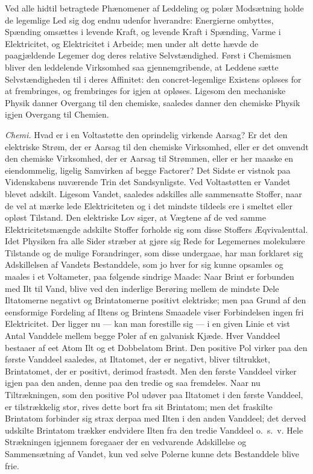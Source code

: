 \documentclass[12pt]{book}
\newcommand{\apage}[1]{\marginnote{\footnotesize\textit{[#1]}}}
\begin{document}
\noindent Ved alle hidtil betragtede Phænomener af Leddeling og polær
Modsætning holde de legemlige Led sig dog endnu udenfor hverandre:
Energierne ombyttes, Spænding omsættes i levende Kraft, og levende Kraft i
Spænding, Varme i Elektricitet, og Elektricitet i Arbeide; men under alt
dette hævde de paagjældende Legemer dog deres relative Selvstændighed.
Først i Chemismen bliver den leddelende Virksomhed saa gjennemgribende, at
Leddene sætte Selvstændigheden til i deres Affinitet: den concret-legemlige
Existens opløses for at frembringes, og frembringes for igjen at opløses.
Ligesom den mechaniske Physik danner Overgang til den chemiske, saaledes
danner den chemiske Physik igjen Overgang til Chemien.

\emph{Chemi.} Hvad er i en Voltastøtte den oprindelig virkende Aarsag? Er
det den elektriske Strøm, der er Aarsag til den chemiske Virksomhed, eller
er det omvendt den chemiske Virksomhed, der er Aarsag til Strømmen, eller
er her maaske en eiendommelig, ligelig Samvirken af begge Factorer? Det
Sidste er vistnok paa Videnskabens nuværende Trin det Sandsynligste. Ved
Voltastøtten er Vandet blevet adskilt. \apage{152} Ligesom Vandet, saaledes adskilles
alle sammensatte Stoffer, naar de vel at mærke lede Elektriciteten og i det
mindste tildeels ere i smeltet eller opløst Tilstand. Den elektriske Lov
siger, at Vægtene af de ved samme Elektricitetsmængde adskilte Stoffer
forholde sig som disse Stoffers Æqvivalenttal. Idet Physiken fra alle
Sider stræber at gjøre sig Rede for Legemernes molekulære Tilstande og de
mulige Forandringer, som disse undergaae, har man forklaret sig
Adskillelsen af Vandets Bestanddele, som jo hver for sig kunne opsamles og
maales i et Voltameter, paa følgende sindrige Maade: Naar Brint er
forbunden med Ilt til Vand, blive ved den inderlige Berøring mellem de
mindste Dele Iltatomerne negativt og Brintatomerne positivt elektriske;
men paa Grund af den eensformige Fordeling af Iltens og Brintens Smaadele
viser Forbindelsen ingen fri Elektricitet. Der ligger nu --- kan man
forestille sig --- i en given Linie et vist Antal Vanddele mellem begge
Poler af en galvanisk Kjæde. Hver Vanddeel bestaaer af eet Atom Ilt og et
Dobbelatom Brint. Den positive Pol virker paa den første Vanddeel saaledes,
at Iltatomet, der er negativt, bliver tiltrukket, Brintatomet, der er
positivt, derimod frastødt. Men den første Vanddeel virker igjen paa den
anden, denne paa den tredie og saa fremdeles. Naar nu Tiltrækningen, som
den positive Pol udøver paa Iltatomet i den første Vanddeel, er
tilstrækkelig stor, rives dette bort fra sit Brintatom; men det fraskilte
Brintatom forbinder sig strax derpaa med Ilten i den anden Vanddeel; det
derved udskilte Brintatom trækker endvidere \apage{153} Ilten fra den tredie Vanddeel
o.\ s.\ v. Hele Strækningen igjennem foregaaer der en vedvarende Adskillelse og
Sammensætning af Vandet, kun ved selve Polerne kunne dets Bestanddele blive
frie.
\end{document}
